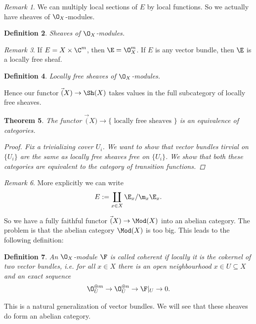 \documentclass[A4paper, british]{amsart}
\theoremstyle{darkgreentheorem}
\newtheorem{thm}{Theorem}[section]
\theoremstyle{darkbluedefinition}
\newtheorem{defn}[thm]{Definition}
\theoremstyle{darkredexample}
\theoremstyle{remark}
\newtheorem{rem}[thm]{Remark}
\newcommand{\1}{\mathbbm{1}}
\newcommand{\op}{\oplus}
\newcommand{\sub}{\subseteq}
\begin{document}
\begin{rem}
    We can multiply local sections of $E$ by local functions.
    So we actually have sheaves of $\O_{X}$-modules.
\end{rem}

\begin{defn}
    Sheaves of $\O_{X}$-modules.
\end{defn}

\begin{rem}
    If $E=X\times \C^{m}$, then $\E=\O_{X}^{m}$.
    If $E$ is any vector bundle, then $\E$ is a locally free sheaf.
\end{rem}

\begin{defn}
    Locally free sheaves of $\O_{X}$-modules.
\end{defn}

Hence our functor $\Vec(X)\to \Sh(X)$ takes values in the full subcategory of locally free sheaves.

\begin{thm}
    The functor $\Vec(X)\to \{ \text{ locally free sheaves }\}$ is an equivalence of categories.
    \begin{proof}
	Fix a trivializing cover $U_{i}$.
	We want to show that vector bundles tirvial on $\{U_{i}\}$ are the same as locally free sheaves free on $\{U_{i}\}$.
	We show that both these categories are equivalent to the category of transition functions.
    \end{proof}
\end{thm}

\begin{rem}
    More explicitly we can write
    \[ E:=\coprod_{x\in X} \E_{x}/\m_{x}\E_{x}. \]
\end{rem}

So we have a fully faithful functor $\Vec(X)\to \Mod(X)$ into an abelian category.
The problem is that the abelian category $\Mod(X)$ is too big.
This leads to the following definition:

\begin{defn}
    An $\O_{X}$-module $\F$ is called \textit{coherent} if locally it is the cokernel of two vector bundles, i.e. for all $x\in X$ there is an open neighbourhood $x\in U\sub X$ and an exact sequence
    \[ \O_{U}^{\op m}\to \O_{U}^{\op n}\to \F|_{U}\to 0.\]
\end{defn}

This is a natural generalization of vector bundles.
We will see that these sheaves do form an abelian category.
\end{document}
